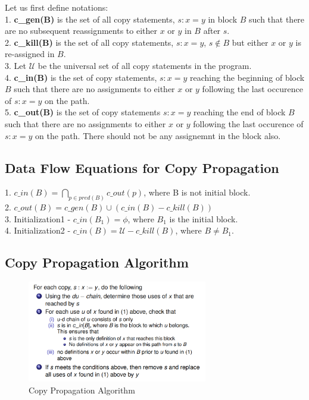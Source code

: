 \documentclass{article}
\begin{document}
Let us first define notations: \\
1. \textbf{c\_gen(B)} is the set of all copy statements, $s: x = y$ in block $B$ such that there are no subsequent reassignments to either $x$ or $y$ in $B$ after $s$. \\
2. \textbf{c\_kill(B)} is the set of all copy statements, $s: x = y$, $s \notin B$ but either $x$ or $y$ is re-assigned in $B$. \\
3. Let $\mathcal{U}$ be the universal set of all copy statements in the program. \\
4. \textbf{c\_in(B)} is the set of copy statements, $s:x = y$ reaching the beginning of block $B$ such that there are no assignments to either $x$ or $y$ following the last occurence of $s: x = y$ on the path. \\
5. \textbf{c\_out(B)} is the set of copy statements $s:x = y$ reaching the end of block $B$ such that there are no assignments to either $x$ or $y$ following the last occurence of $s: x = y$ on the path. There should not be any assignemnt in the block also.\\

\subsection*{Data Flow Equations for Copy Propagation}
1. $c\_in(B) = \bigcap_{p \in pred(B)} c\_out(p)$, where B is not initial block. \\
2. $c\_out(B) = c\_gen(B) \cup (c\_in(B) - c\_kill(B))$ \\
3. Initialization1 - $c\_in(B_1) = \phi$, where $B_1$ is the initial block. \\
4. Initialization2 - $c\_in(B) = \mathcal{U} - c\_kill(B)$, where $B \neq B_1$. \\ 

\subsection*{Copy Propagation Algorithm}

\begin{figure}[h]
    \centering
    \includegraphics[width=0.7\textwidth]{Images/CP2.png}
    \caption{Copy Propagation Algorithm}
    \label{fig:CopyPropagation}
\end{figure}
\end{document}

